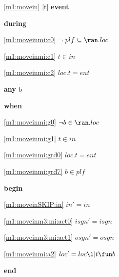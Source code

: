 \noindent \ref{m1:movein} [t] \textbf{event}
\begin{block}
\item \textbf{during}
\begin{block}
\item[ \eqref{m1:moveinmi:c0} ]$\neg ~ plf \subseteq \ran.loc $ %
\item[ \eqref{m1:moveinmi:c1} ]$t \in in $ %
\item[ \eqref{m1:moveinmi:c2} ]$loc.t = ent $ %
\end{block}
\item \textbf{any} b
\item \textbf{when}
\begin{block}
\item[ \eqref{m1:moveinmi:g0} ]$\neg b \in \ran.loc  	$ %
\item[ \eqref{m1:moveinmi:g1} ]$t \in in $ %
\item[ \eqref{m1:moveinmi:grd0} ]$loc.t = ent $ %
\item[ \eqref{m1:moveinmi:grd7} ]$b \in plf $ %
\end{block}
\item \textbf{begin}
\begin{block}
\item[ \eqref{m1:moveinSKIP:in} ]$in' = in$ %
\item[ \eqref{m1:moveinm3:mi:act0} ]$isgn' = isgn$ %
\item[ \eqref{m1:moveinm3:mi:act1} ]$osgn' = osgn$ %
\item[ \eqref{m1:moveinmi:a2} ]$loc' = loc \1| t \fun b $ %
\end{block}
\item \textbf{end} \\
\end{block}
